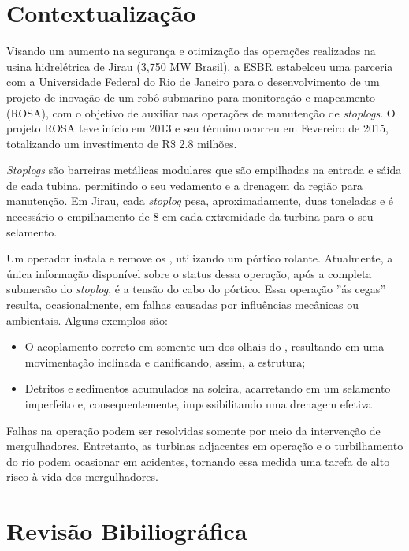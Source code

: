 \section*{Contextualização}
Visando um aumento na segurança e otimização das operações realizadas na usina 
hidrelétrica de Jirau (3,750 MW Brasil), a ESBR estabelceu uma parceria com a 
Universidade Federal do Rio de Janeiro para o desenvolvimento de um projeto de 
inovação de um robô submarino para monitoração e mapeamento (ROSA), com o
objetivo de auxiliar nas operações de manutenção de \textit{stoplogs}. O projeto
ROSA teve início em 2013 e seu término ocorreu em Fevereiro de 2015, totalizando
um investimento de R\$ 2.8 milhões.

\textit{Stoplogs} são barreiras metálicas modulares que são empilhadas na
entrada e sáida de cada tubina, permitindo o seu vedamento e a drenagem da
região para manutenção. Em Jirau, cada \textit{stoplog} pesa, aproximadamente,
duas toneladas e é necessário o empilhamento de 8  em cada extremidade
da turbina para o seu selamento.

Um operador instala e remove os , utilizando um pórtico
rolante. Atualmente, a única informação disponível sobre o status dessa
operação, após a completa submersão do \textit{stoplog}, é a tensão do cabo do
pórtico. Essa operação ''ás cegas'' resulta, ocasionalmente, em falhas causadas 
por influências mecânicas ou ambientais. Alguns exemplos são:

\begin{itemize}
  \item O acoplamento correto em somente um dos olhais do ,
  resultando em uma movimentação inclinada e danificando, assim, a estrutura;
  \item Detritos e sedimentos acumulados na soleira, acarretando em um selamento
  imperfeito e, consequentemente, impossibilitando uma drenagem efetiva
\end{itemize}

Falhas na operação podem ser resolvidas somente por meio da intervenção de
mergulhadores. Entretanto, as turbinas adjacentes em operação e o turbilhamento
do rio podem ocasionar em acidentes, tornando essa medida uma tarefa de alto risco à vida dos
mergulhadores.

\section*{Revisão Bibiliográfica}

